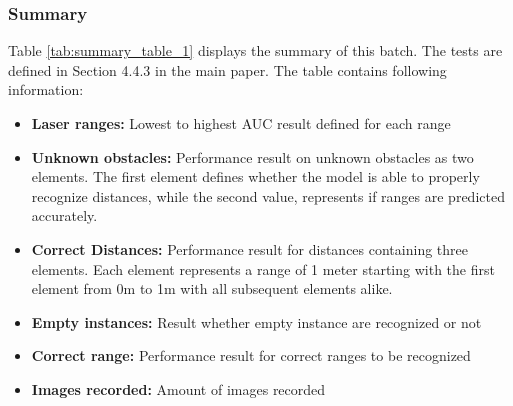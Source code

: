 \subsubsection{Summary\label{summary_batch_1} }
Table \ref{tab:summary_table_1} displays the summary of this batch. The tests are defined in Section 4.4.3 in the main paper. The table contains following information:
\begin{itemize}
\item  \textbf{Laser ranges: }Lowest to highest AUC result defined for each range
\item  \textbf{Unknown obstacles: }Performance result on unknown obstacles as two elements. The first element defines whether the model is able to properly recognize distances, while the second value, represents if ranges are predicted accurately.
\item  \textbf{Correct Distances: }Performance result for distances containing three elements. Each element represents a range of 1 meter starting with the first element from 0m to 1m with all subsequent elements alike.
\item  \textbf{Empty instances: }Result whether empty instance are recognized or not
\item  \textbf{Correct range: }Performance result for correct ranges to be recognized
\item  \textbf{Images recorded: }Amount of images recorded
\end{itemize}


